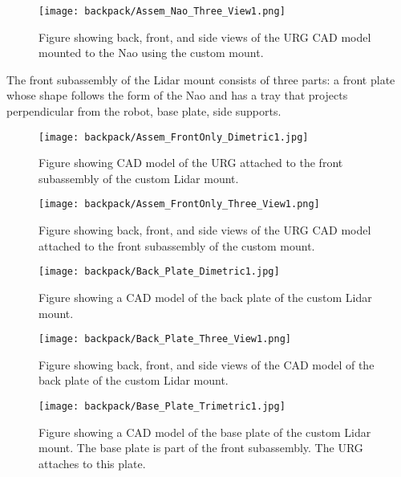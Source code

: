 \begin{figure}
\centering
\texttt{[image: backpack/Assem\_Nao\_Three\_View1.png]}
\caption{Figure showing back, front, and side views of the URG CAD model 
         mounted to the Nao using the custom mount.}
\label{fig:nao_lidar_mount_nao_three_view1}
\end{figure}

The front subassembly of the Lidar mount consists of three parts: a front plate
whose shape follows the form of the Nao and has a tray that projects
perpendicular from the robot, base plate, side supports.

\begin{figure}
\centering
\texttt{[image: backpack/Assem\_FrontOnly\_Dimetric1.jpg]}
\caption{Figure showing CAD model of the URG attached to the front subassembly
         of the custom Lidar mount.}
\label{fig:nao_lidar_mount_dimetric1}
\end{figure}

\begin{figure}
\centering
\texttt{[image: backpack/Assem\_FrontOnly\_Three\_View1.png]}
\caption{Figure showing back, front, and side views of the URG CAD model
         attached to the front subassembly of the custom mount.}
\label{fig:nao_lidar_mount_three_view1}
\end{figure}

\begin{figure}
\centering
\texttt{[image: backpack/Back\_Plate\_Dimetric1.jpg]}
\caption{Figure showing a CAD model of the back plate of the custom
         Lidar mount.}
\label{fig:nao_lidar_mount_backplate_dimetric1}
\end{figure}

\begin{figure}
\centering
\texttt{[image: backpack/Back\_Plate\_Three\_View1.png]}
\caption{Figure showing back, front, and side views of the CAD model of the
         back plate of the custom Lidar mount.}
\label{fig:nao_lidar_mount_backplate_three_view1}
\end{figure}

\begin{figure}
\centering
\texttt{[image: backpack/Base\_Plate\_Trimetric1.jpg]}
\caption{Figure showing a CAD model of the base plate of the custom Lidar
         mount. The base plate is part of the front subassembly.
         The URG attaches to this plate.}
\label{fig:nao_lidar_mount_baseplate_trimetric1}
\end{figure}

